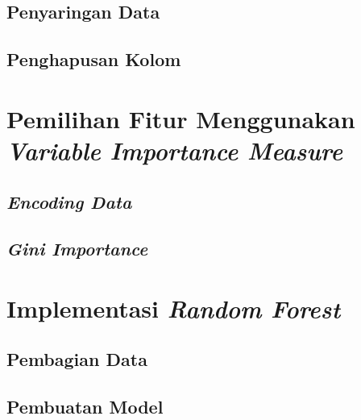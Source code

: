 \documentclass[ugmtesis]{ugmtesis}
\begin{document}
		\subsection{Penyaringan Data}
		\label{implementasi penyaringan data}
		

		\subsection{Penghapusan Kolom}
		\label{implementasi penghapusan kolom}
		

	\section{Pemilihan Fitur Menggunakan \textit{Variable Importance Measure}}
	\label{implementasi pemilihan fitur menggunakan variable importance measure}
	

			\subsection{\textit{Encoding Data}}
			\label{implementasi encoding data}
			

			\subsection{\textit{Gini Importance}}
			\label{implementasi gini importance}
			

	\section{Implementasi \textit{Random Forest}}
	\label{implementasi random forest}
	

		\subsection{Pembagian Data}
		\label{implementasi pembagian data}
		

		\subsection{Pembuatan Model}
		\label{implementasi pembuatan model}
		
\end{document}
